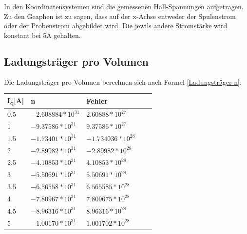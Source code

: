 \documentclass[titlepage=firstcover, captions=tableheading]{scrartcl}
\begin{document}
In den Koordinatensystemen sind die gemessenen Hall-Spannungen aufgetragen.
Zu den Geaphen ist zu sagen, dass auf der x-Achse entweder der Spulenstrom oder der Probenstrom abgebildet wird.
Die jewils andere Stromstärke wird konstant bei 5A gehalten.

\subsection{Ladungsträger pro Volumen}
Die Ladungsträger pro Volumen berechnen sich nach Formel \ref{Ladungsträger n}:
\begin{center}
    \begin{tabular}{ll@{${}\pm{}$}lll}
        \toprule
        I\textsubscript{q}[A]&n&Fehler \\
        \midrule
        0.5 &$ -2.608884*10^{31}$&$2.60888*10^{27} $\\
        1   &$  -9.37586*10^{31}$&$9.37586*10^{27}$\\
        1.5 &$  -1.73401*10^{31}$&$-1.734036*10^{28}$\\
        2   &$  -2.89982*10^{31}$&$-2.89982*10^{28}$\\
        2.5 &$  -4.10853*10^{31}$&$4.10853*10^{28} $\\
        3   &$  -5.50691*10^{31}$&$5.50691*10^{28} $\\
        3.5 &$  -6.56558*10^{31}$&$6.565585*10^{28}$\\
        4   &$  -7.80967*10^{31}$&$7.809675*10^{28}$\\    
        4.5 &$  -8.96316*10^{31}$&$8.96316*10^{28} $\\
        5   &$  -1.00170*10^{31}$&$1.001702*10^{28}$\\
        \bottomrule
    \end{tabular}
\end{center}
\end{document}
